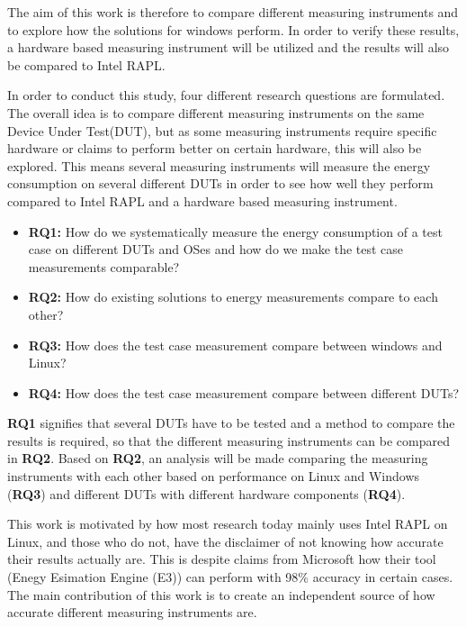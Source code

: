 The aim of this work is therefore to compare different measuring instruments and to explore how the solutions for windows perform. 
In order to verify these results, a hardware based measuring instrument will be utilized and the results will also be compared to Intel RAPL.

In order to conduct this study, four different research questions are formulated. The overall idea is to compare different measuring instruments on the same Device Under Test(DUT), but as some measuring instruments require specific hardware or claims to perform better on certain hardware, this will also be explored. This means several measuring instruments will measure the energy consumption on several different DUTs in order to see how well they perform compared to Intel RAPL and a hardware based measuring instrument.


\begin{itemize}
    \item \textbf{RQ1:} How do we systematically measure the energy consumption of a test case on different DUTs and OSes and how do we make the test case measurements comparable?
    \item \textbf{RQ2:} How do existing solutions to energy measurements compare to each other?
    \item \textbf{RQ3:} How does the test case measurement compare between windows and Linux?
    \item \textbf{RQ4:} How does the test case measurement compare between different DUTs?
\end{itemize}

\textbf{RQ1} signifies that several DUTs have to be tested and a method to compare the results is required, so that the different measuring instruments can be compared in \textbf{RQ2}. Based on \textbf{RQ2}, an analysis will be made comparing the measuring instruments with each other based on performance on Linux and Windows (\textbf{RQ3}) and different DUTs with different hardware components (\textbf{RQ4}).

This work is motivated by how most research today mainly uses Intel RAPL on Linux\cite[]{Rasmussen2021,Pereira2017,Theilmann2022,Lindholt2022}, and those who do not, have the disclaimer of not knowing how accurate their results actually are\cite[]{Bruce2015ReducingEC, Ozturk2019, Unlu2021}. This is despite claims from Microsoft how their tool (Enegy Esimation Engine (E3)) can perform with 98\% accuracy in certain cases\cite[]{E3WinHec}. The main contribution of this work is to create an independent source of how accurate different measuring instruments are.





